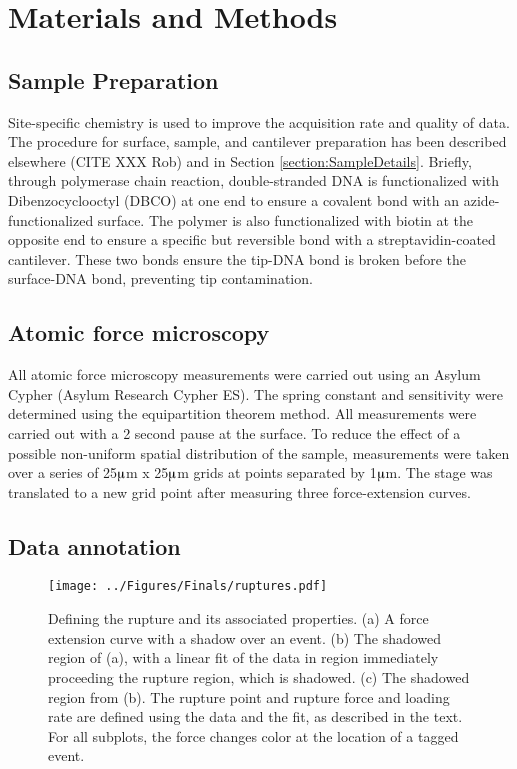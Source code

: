 \documentclass[%
  aip,12pt,tightenlines,
  amsthm,
 amsmath,amssymb
]{article}
\newcommand{\sRef}[1]{Section \ref{section:#1}}
\newcommand{\fLabel}[1]{\label{figure:#1}}
\newcommand{\sLabel}[1]{\label{section:#1}}
\newcommand{\firstp}[0]{}
\newcommand{\pl}[0]{\vspace{6pt}}
\newcommand{\figwidth}[0]{\linewidth}
\newcommand{\supply}[2]{(#1 #2)}
\newcommand{\citePRH}[1]{\cite{#1}}
\begin{document}
\section{\sLabel{Materials}Materials and Methods}

\subsection{Sample Preparation}

\firstp Site-specific chemistry is used to improve the acquisition rate and quality of data. The procedure for surface, sample, and cantilever preparation has been described elsewhere (CITE XXX Rob) and in \sRef{SampleDetails}. Briefly, through polymerase chain reaction, double-stranded DNA is functionalized with Dibenzocyclooctyl (DBCO) at one end to ensure a covalent bond with an azide-functionalized surface. The polymer is also functionalized with biotin at the opposite end to ensure a specific but reversible bond with a streptavidin-coated cantilever. These two bonds ensure the tip-DNA bond is broken before the surface-DNA bond, preventing tip contamination. \pl

\subsection{\sLabel{Surface}Atomic force microscopy}

\firstp All atomic force microscopy measurements were carried out using an Asylum Cypher \supply{Asylum Research}{Cypher ES}. The spring constant and sensitivity were determined using the equipartition theorem method\citePRH{cleveland_nondestructive_1993}. All measurements were carried out with a 2 second pause at the surface. To reduce the effect of a possible non-uniform spatial distribution of the sample, measurements were taken over a series of 25$\muup$m x 25$\muup$m grids at points separated by 1$\muup$m. The stage was translated to a new grid point after measuring three force-extension curves. \pl

\subsection{\sLabel{Annotation}Data annotation}


\begin{figure}
\centering
\texttt{[image: ../Figures/Finals/ruptures.pdf]}%
\caption[Definition of rupture force and loading rate]{\fLabel{Rupture} Defining the rupture and its associated properties. (a) A force extension curve with a shadow over an event. (b) The shadowed region of (a), with a linear fit of the data in region immediately proceeding the rupture region, which is shadowed. (c) The shadowed region from (b). The rupture point and rupture force and loading rate are defined using the data and the fit, as described in the text. For all subplots, the force changes color at the location of a tagged event. }
\end{figure}
\end{document}
